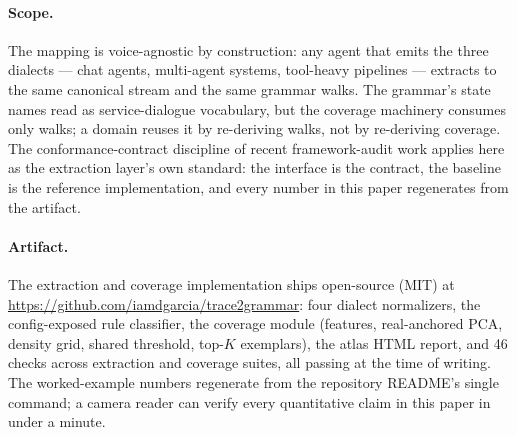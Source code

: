 \paragraph{Scope.}
The mapping is voice-agnostic by construction: any agent that emits the three dialects ---
chat agents, multi-agent systems, tool-heavy pipelines --- extracts to the same canonical
stream and the same grammar walks.
The grammar's state names read as service-dialogue vocabulary, but the coverage machinery
consumes only walks; a domain reuses it by re-deriving walks, not by re-deriving coverage.
The conformance-contract discipline of recent framework-audit work
\citep{resume2026,stopmeansstop2026} applies here as the extraction layer's own standard:
the interface is the contract, the baseline is the reference implementation, and every
number in this paper regenerates from the artifact.

\paragraph{Artifact.}
The extraction and coverage implementation ships open-source (MIT) at
\url{https://github.com/iamdgarcia/trace2grammar}: four dialect normalizers, the
config-exposed rule classifier, the coverage module (features, real-anchored PCA, density
grid, shared threshold, top-$K$ exemplars), the atlas HTML report, and 46 checks across
extraction and coverage suites, all passing at the time of writing.
The worked-example numbers regenerate from the repository README's single command; a camera
reader can verify every quantitative claim in this paper in under a minute.
